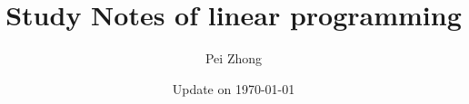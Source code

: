 \documentclass[12pt,oneside]{book} %
\begin{document}
\title{\bf \huge Study Notes of linear programming}
\author{Pei Zhong}
\date{Update on \today}

\maketitle


\tableofcontents

\begin{spacing}{1}









% 


% 

% 

% 




\end{spacing}
\end{document}
